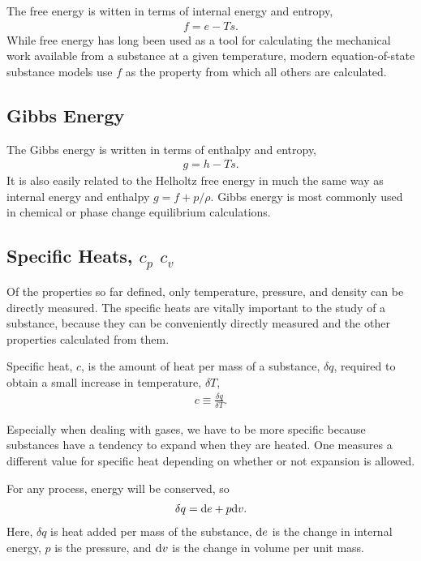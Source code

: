 The free energy is witten in terms of internal energy and entropy,
\begin{align}
f = e - Ts \label{eqn:intro:f}.
\end{align}
While free energy has long been used as a tool for calculating the mechanical work available from a substance at a given temperature, modern equation-of-state substance models use $f$ as the property from which all others are calculated.

\subsection{Gibbs Energy}

The Gibbs energy is written in terms of enthalpy and entropy,
\begin{align}
g = h - Ts \label{eqn:intro:g}.
\end{align}
It is also easily related to the Helholtz free energy in much the same way as internal energy and enthalpy $g = f + p/\rho$.  Gibbs energy is most commonly used in chemical or phase change equilibrium calculations.

\subsection{Specific Heats, $c_p$ $c_v$}\label{sec:intro:c}

Of the properties so far defined, only temperature, pressure, and density can be directly measured.  The specific heats are vitally important to the study of a substance, because they can be conveniently directly measured and the other properties calculated from them.

Specific heat, $c$, is the amount of heat per mass of a substance, $\delta q$, required to obtain a small increase in temperature, $\delta T$,
\begin{align}
c \equiv \frac{\delta q}{\delta T}.
\end{align}

Especially when dealing with gases, we have to be more specific because substances have a tendency to expand when they are heated.  One measures a different value for specific heat depending on whether or not expansion is allowed. 

For any process, energy will be conserved, so
\begin{align}
\delta q = \mathrm{d} e + p\mathrm{d} v.\label{eqn:intro:1stlaw}
\end{align}
Here, $\delta q$ is heat added per mass of the substance, $\mathrm{d} e$ is the change in internal energy, $p$ is the pressure, and $\mathrm{d} v$ is the change in volume per unit mass.

